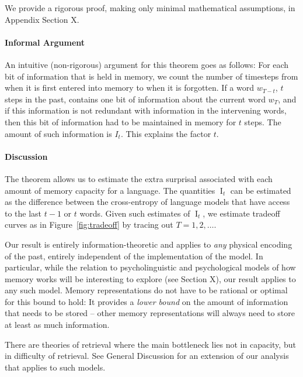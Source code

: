 We provide a rigorous proof, making only minimal mathematical assumptions, in Appendix Section X.

\paragraph{Informal Argument}
An intuitive (non-rigorous) argument for this theorem goes as follows:
For each bit of information that is held in memory, we count the number of timesteps from when it is first entered into memory to when it is forgotten.
If a word $w_{T-t}$, $t$ steps in the past, contains one bit of information about the current word $w_T$, and if this information is not redundant with information in the intervening words, then this bit of information had to be maintained in memory for $t$ steps.
The amount of such information is $I_t$. This explains the factor $t$.


\paragraph{Discussion}
The theorem allows us to estimate the extra surprisal associated with each amount of memory capacity for a language.
The quantities $\operatorname{I}_t$ can be estimated as the difference between the cross-entropy of language models that have access to the last $t-1$ or $t$ words.
Given such estimates of $\operatorname{I}_t$, we estimate tradeoff curves as in Figure~\ref{fig:tradeoff} by tracing out $T=1, 2, \dots$.


Our result is entirely information-theoretic and applies to \emph{any} physical encoding of the past, entirely independent of the implementation of the model. %
In particular, while the relation to psycholinguistic and psychological models of how memory works will be interesting to explore (see Section X), our result applies to any such model.
Memory representations do not have to be rational or optimal for this bound to hold:
It provides a \emph{lower bound} on the amount of information that needs to be stored -- other memory representations will always need to store at least as much information.



There are theories of retrieval where the main bottleneck lies not in capacity, but in difficulty of retrieval. See General Discussion for an extension of our analysis that applies to such models.




